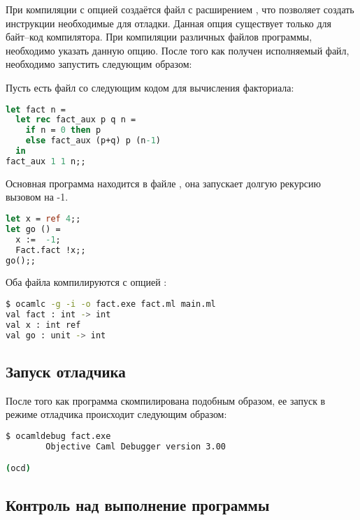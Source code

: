 При компиляции с опцией  создаётся файл с расширением , что 
позволяет создать инструкции необходимые для отладки. Данная опция существует 
только для байт--код компилятора. При компиляции различных файлов программы, 
необходимо указать данную опцию. После того как получен исполняемый файл, 
необходимо запустить  следующим образом:


Пусть есть файл  со следующим кодом для вычисления факториала:

\begin{lstlisting}[language=Ocaml]
let fact n = 
  let rec fact_aux p q n = 
    if n = 0 then p
    else fact_aux (p+q) p (n-1)
  in
fact_aux 1 1 n;;
\end{lstlisting}

Основная программа находится в файле , она запускает долгую 
рекурсию вызовом  на -1.

\begin{lstlisting}[language=Ocaml]
let x = ref 4;;
let go () = 
  x :=  -1;
  Fact.fact !x;;
go();;
\end{lstlisting}

Оба файла компилируются с опцией :

\begin{lstlisting}[language=Bash]
$ ocamlc -g -i -o fact.exe fact.ml main.ml
val fact : int -> int
val x : int ref
val go : unit -> int
\end{lstlisting}

\subsection {Запуск отладчика}
\label{subsubsec:starting_the_debugger}

После того как программа скомпилирована подобным образом, ее запуск в режиме 
отладчика происходит следующим образом:

\begin{lstlisting}[language=Bash]
$ ocamldebug fact.exe
        Objective Caml Debugger version 3.00

(ocd) 
\end{lstlisting}

\subsection {Контроль над выполнение программы}
\label{subsec:execution_control}

